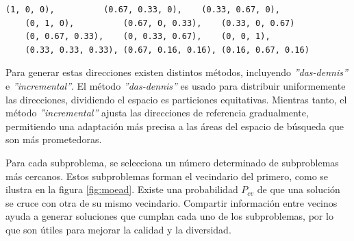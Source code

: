 \begin{small}
\begin{lstlisting}[basicstyle=\ttfamily, caption=Direcciones de referencia.,label={lst:direcciones}]
    (1, 0, 0),          (0.67, 0.33, 0),    (0.33, 0.67, 0),
    (0, 1, 0),          (0.67, 0, 0.33),    (0.33, 0, 0.67)
    (0, 0.67, 0.33),    (0, 0.33, 0.67),    (0, 0, 1),
    (0.33, 0.33, 0.33), (0.67, 0.16, 0.16), (0.16, 0.67, 0.16)
\end{lstlisting}
\end{small}

Para generar estas direcciones existen distintos métodos, incluyendo \textit{''das-dennis''} e \textit{''incremental''}. El método \textit{''das-dennis''} es usado para distribuir uniformemente las direcciones, dividiendo el espacio es particiones equitativas. Mientras tanto, el método \textit{''incremental''} ajusta las direcciones de referencia gradualmente, permitiendo una adaptación más precisa a las áreas del espacio de búsqueda que son más prometedoras.

Para cada subproblema, se selecciona un número determinado de subproblemas más cercanos. Estos subproblemas forman el vecindario del primero, como se ilustra en la figura \ref{fig:moead}. Existe una probabilidad \( P_{cv} \) de que una solución se cruce con otra de su mismo vecindario. Compartir información entre vecinos ayuda a generar soluciones que cumplan cada uno de los subproblemas, por lo que son útiles para mejorar la calidad y la diversidad.~\cite{moead_pymoo}

